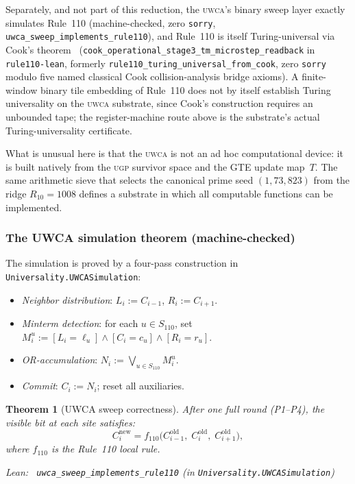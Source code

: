 \documentclass[11pt,a4paper]{article}
\newenvironment{leanref}%
  {\par\smallskip\noindent\begingroup\raggedright\textup{Lean:}~}%
  {\par\endgroup}
\newtheorem{theorem}{Theorem}[section]
\theoremstyle{definition}
\newcommand{\ugp}{\textsc{ugp}}
\newcommand{\uwca}{\textsc{uwca}}
\begin{document}
Separately, and not part of this reduction, the \uwca{}'s binary sweep layer exactly
simulates Rule~110 (machine-checked, zero \texttt{sorry},
\lstinline|uwca_sweep_implements_rule110|), and Rule~110 is itself Turing-universal
via Cook's theorem~\cite{Cook2004,Wolfram1984,Wolfram2002}
(\lstinline|cook_operational_stage3_tm_microstep_readback| in \texttt{rule110-lean},
formerly \lstinline|rule110_turing_universal_from_cook|, zero \texttt{sorry} modulo five
named classical Cook collision-analysis bridge axioms).  A finite-window binary
tile embedding of Rule~110 does not by itself establish Turing universality on the
\uwca{} substrate, since Cook's construction requires an unbounded tape; the
register-machine route above is the substrate's actual Turing-universality
certificate.

What is unusual here is that the \uwca{} is not an ad hoc computational
device: it is built natively from the \ugp{} survivor space and the GTE
update map~$T$.  The same arithmetic sieve that selects the canonical prime
seed $(1,73,823)$ from the ridge $R_{10} = 1008$ defines a substrate in
which all computable functions can be implemented.

\subsubsection{The UWCA simulation theorem (machine-checked)}

The simulation is proved by a four-pass construction in
\texttt{Universality.UWCASimulation}:

\begin{itemize}[nosep]
\item[\textbf{P1}] \emph{Neighbor distribution}: $L_i := C_{i-1}$, $R_i := C_{i+1}$.
\item[\textbf{P2}] \emph{Minterm detection}: for each $u \in S_{110}$, set
  $M^u_i := [L_i = \ell_u] \wedge [C_i = c_u] \wedge [R_i = r_u]$.
\item[\textbf{P3}] \emph{OR-accumulation}: $N_i := \bigvee_{u \in S_{110}} M^u_i$.
\item[\textbf{P4}] \emph{Commit}: $C_i := N_i$; reset all auxiliaries.
\end{itemize}

\begin{theorem}[UWCA sweep correctness]\label{thm:uwca-sweep}
After one full round (P1–P4), the visible bit at each site satisfies:
\[
  C_i^{\mathrm{new}} = f_{110}\bigl(C_{i-1}^{\mathrm{old}},\; C_i^{\mathrm{old}},\; C_{i+1}^{\mathrm{old}}\bigr),
\]
where $f_{110}$ is the Rule~110 local rule.

\begin{leanref} \lstinline|uwca_sweep_implements_rule110|
\textup{(in \texttt{Universality.UWCASimulation})}
\end{leanref}
\end{theorem}
\end{document}
